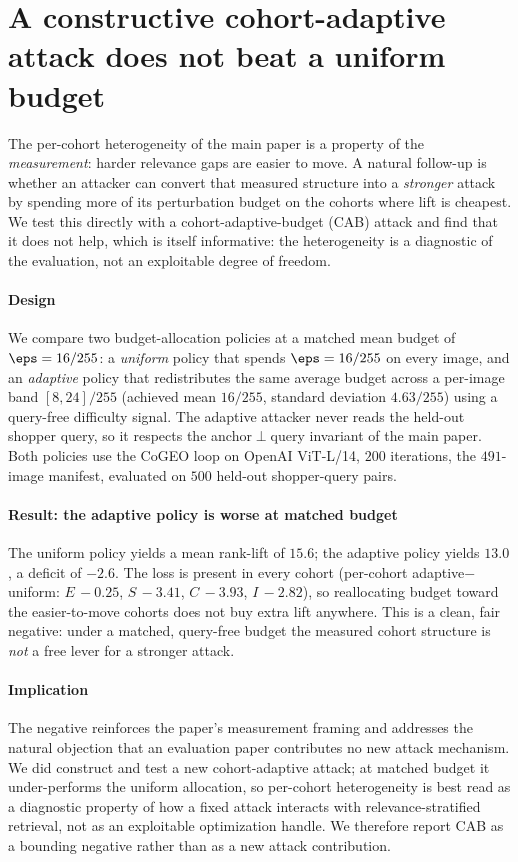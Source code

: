 \section{A constructive cohort-adaptive attack does not beat a uniform budget}
\label{sm:cab}

The per-cohort heterogeneity of the main paper is a property of the \emph{measurement}: harder relevance gaps are easier to move. A natural follow-up is whether an attacker can convert that measured structure into a \emph{stronger} attack by spending more of its perturbation budget on the cohorts where lift is cheapest. We test this directly with a cohort-adaptive-budget (CAB) attack and find that it does not help, which is itself informative: the heterogeneity is a diagnostic of the evaluation, not an exploitable degree of freedom.

\paragraph{Design} We compare two budget-allocation policies at a matched mean budget of $\eps = 16/255$: a \emph{uniform} policy that spends $\eps = 16/255$ on every image, and an \emph{adaptive} policy that redistributes the same average budget across a per-image band $[8, 24]/255$ (achieved mean $16/255$, standard deviation $4.63/255$) using a query-free difficulty signal. The adaptive attacker never reads the held-out shopper query, so it respects the anchor$\perp$query invariant of the main paper. Both policies use the CoGEO loop on OpenAI ViT-L/14, $200$ iterations, the $491$-image manifest, evaluated on $500$ held-out shopper-query pairs.

\paragraph{Result: the adaptive policy is worse at matched budget} The uniform policy yields a mean rank-lift of $15.6$; the adaptive policy yields $13.0$, a deficit of $-2.6$. The loss is present in every cohort (per-cohort adaptive$-$uniform: $E\,{-}0.25$, $S\,{-}3.41$, $C\,{-}3.93$, $I\,{-}2.82$), so reallocating budget toward the easier-to-move cohorts does not buy extra lift anywhere. This is a clean, fair negative: under a matched, query-free budget the measured cohort structure is \emph{not} a free lever for a stronger attack.

\paragraph{Implication} The negative reinforces the paper's measurement framing and addresses the natural objection that an evaluation paper contributes no new attack mechanism. We did construct and test a new cohort-adaptive attack; at matched budget it under-performs the uniform allocation, so per-cohort heterogeneity is best read as a diagnostic property of how a fixed attack interacts with relevance-stratified retrieval, not as an exploitable optimization handle. We therefore report CAB as a bounding negative rather than as a new attack contribution.

